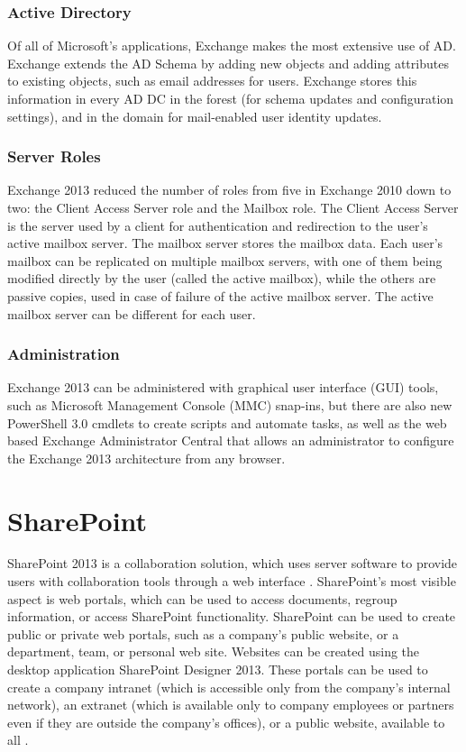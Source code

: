 \subsubsection{Active Directory}
Of all of Microsoft's applications, Exchange makes the most extensive use of AD. 
Exchange extends the AD Schema by adding new objects and adding attributes to existing objects, such as email addresses for users.
Exchange stores this information in every AD DC in the forest (for schema updates and configuration settings), and in the domain for mail-enabled user identity updates\cite[Ch. 1]{redmond_microsoft_2010}.

\subsubsection{Server Roles}
Exchange 2013 reduced the number of roles from five in Exchange 2010 down to two: the Client Access Server role and the Mailbox role. The Client Access Server is the server used by a client for authentication and redirection to the user's active mailbox server. The mailbox server stores the mailbox data. Each user's mailbox can be replicated on multiple mailbox servers, with one of them being modified directly by the user (called the active mailbox), while the others are passive copies, used in case of failure of the active mailbox server. The active mailbox server can be different for each user\cite[Ch. 1]{redmond_microsoft_2010}.

\subsubsection{Administration}
Exchange 2013 can be administered with graphical user interface (GUI) tools, such as Microsoft Management Console (MMC) snap-ins, but there are also new PowerShell 3.0 cmdlets to create scripts and automate tasks, as well as the web based Exchange Administrator Central that allows an administrator to configure the Exchange 2013 architecture from any browser\cite[Ch. 3\&5]{redmond_microsoft_2010}.




\section{SharePoint}

SharePoint 2013 is a collaboration solution, which uses server software to provide users with collaboration tools through a web interface
\cite[Ch. 1]{husman_beginning_2010}.
SharePoint's most visible aspect is web portals, which can be used to access documents, regroup information, or access SharePoint functionality.
SharePoint can be used to create public or private web portals, such as a company's public website, or a department, team, or personal web site. Websites can be created using the desktop application SharePoint Designer 2013.
These portals can be used to create a company intranet (which is accessible only from the company's internal network), an extranet (which is available only to company employees or partners even if they are outside the company's offices), or a public website, available to all
\cite[Ch. 1]{husman_beginning_2010}.



